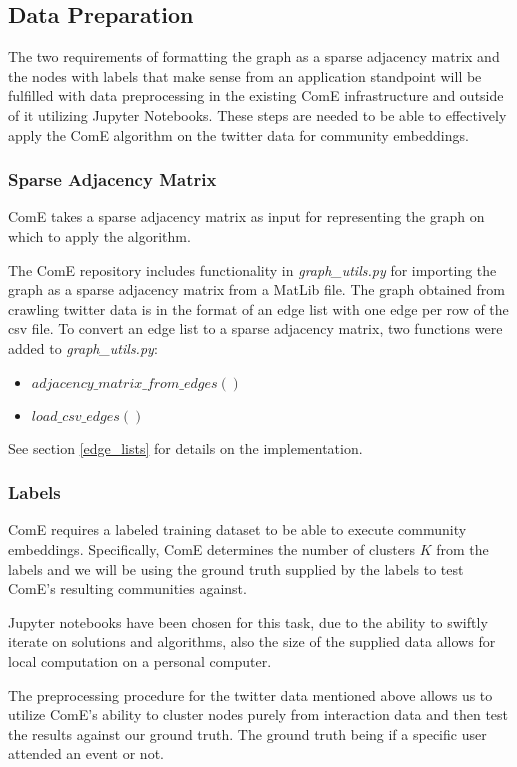 \documentclass[sigconf]{acmart}
\begin{document}
\subsection{Data Preparation}

The two requirements of formatting the graph as a sparse adjacency matrix and the nodes with labels that make sense from an application standpoint will be fulfilled with data preprocessing in the existing ComE infrastructure and outside of it utilizing Jupyter Notebooks. These steps are needed to be able to effectively apply the ComE algorithm on the twitter data for community embeddings.

\subsubsection{Sparse Adjacency Matrix}
ComE takes a sparse adjacency matrix as input for representing the graph on which to apply the algorithm.

The ComE repository includes functionality in \textit{graph\_utils.py} for importing the graph as a sparse adjacency matrix from a MatLib file.\cite{ComE} The graph obtained from crawling twitter data is in the format of an edge list with one edge per row of the csv file. To convert an edge list to a sparse adjacency matrix, two functions were added to \textit{graph\_utils.py}:

\begin{itemize}
	\item $adjacency\_matrix\_from\_edges()$
	\item $load\_csv\_edges()$
\end{itemize}

See section \ref{edge_lists} for details on the implementation.

\subsubsection{Labels} ComE requires a labeled training dataset to be able to execute community embeddings. Specifically, ComE determines the number of clusters $K$ from the labels \cite{ComE} and we will be using the ground truth supplied by the labels to test ComE's resulting communities against.

Jupyter notebooks have been chosen for this task, due to the ability to swiftly iterate on solutions and algorithms, also the size of the supplied data allows for local computation on a personal computer.

The preprocessing procedure for the twitter data mentioned above allows us to utilize ComE's ability to cluster nodes purely from interaction data and then test the results against our ground truth. The ground truth being if a specific user attended an event or not.
\end{document}
